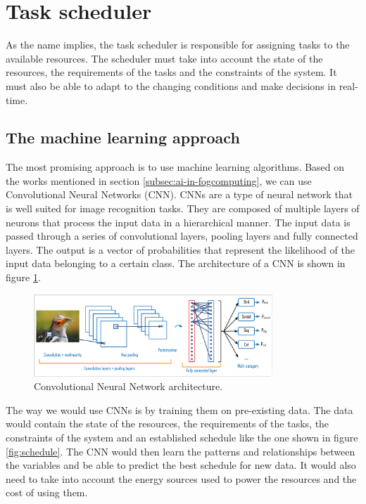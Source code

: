 \section{Task scheduler}
\label{sec:task-scheduler}

As the name implies, the task scheduler is responsible for assigning tasks to the available resources. The scheduler
must take into account the state of the resources, the requirements of the tasks and the constraints of the system.
It must also be able to adapt to the changing conditions and make decisions in real-time.

\subsection{The machine learning approach}
\label{subsec:ml-approach}

The most promising approach is to use machine learning algorithms. Based on the works mentioned in section
\ref{subsec:ai-in-fogcomputing}, we can use Convolutional Neural Networks (CNN). CNNs are a type of neural network
that is well suited for image recognition tasks. They are composed of multiple layers of neurons that process the input
data in a hierarchical manner. The input data is passed through a series of convolutional layers, pooling layers and
fully connected layers. The output is a vector of probabilities that represent the likelihood of the input data belonging
to a certain class. The architecture of a CNN is shown in figure \ref{fig:cnn}.

\begin{figure}[H]
	\centering
	\includegraphics[width=0.8\textwidth]{../images/architectureCNN.png}
	\caption{Convolutional Neural Network architecture.\cite{nada-belaidi-cnn}}
	\label{fig:cnn}
\end{figure}

The way we would use CNNs is by training them on pre-existing data. The data would contain the state of the resources,
the requirements of the tasks, the constraints of the system and an established schedule like the one shown in figure
\ref{fig:schedule}. The CNN would then learn the patterns and relationships between the variables and be able to predict
the best schedule for new data. It would also need to take into account the energy sources used to power the resources
and the cost of using them.

